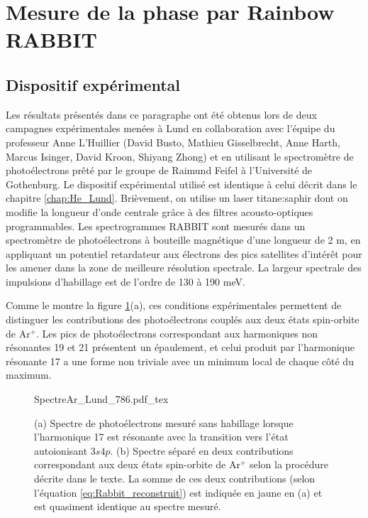 \section{Mesure de la phase par Rainbow RABBIT}
\label{sec:ArRainbow}
\subsection{Dispositif expérimental}
Les résultats présentés dans ce paragraphe ont été obtenus lors de deux campagnes expérimentales menées à Lund en collaboration avec l'équipe du professeur Anne L'Huillier (David Busto, Mathieu Gisselbrecht, Anne Harth, Marcus Isinger, David Kroon, Shiyang Zhong) et en utilisant le spectromètre de photoélectrons prêté par le groupe de Raimund Feifel à l'Université de Gothenburg. Le dispositif expérimental utilisé est identique à celui décrit dans le chapitre \ref{chap:He_Lund}. Brièvement, on utilise un laser titane:saphir dont on modifie la longueur d'onde centrale grâce à des filtres acousto-optiques programmables. Les spectrogrammes RABBIT sont mesurés dans un spectromètre de photoélectrons à bouteille magnétique d'une longueur de 2 m, en appliquant un potentiel retardateur aux électrons des pics satellites d'intérêt pour les amener dans la zone de meilleure résolution spectrale. La largeur spectrale des impulsions d'habillage est de l'ordre de 130 à 190 meV. 

Comme le montre la figure \ref{fig:SpectreAr_Lund_786}(a), ces conditions expérimentales permettent de distinguer les contributions des photoélectrons couplés aux deux états spin-orbite de Ar$^+$. Les pics de photoélectrons correspondant aux harmoniques non résonantes 19 et 21 présentent un épaulement, et celui produit par l'harmonique résonante 17 a une forme non triviale avec un minimum local de chaque côté du maximum. 

\begin{figure}
\centering
\def\svgwidth{1\textwidth}
{SpectreAr_Lund_786.pdf_tex}
\caption{(a) Spectre de photoélectrons mesuré sans habillage lorsque l'harmonique 17 est résonante avec la transition vers l'état autoionisant $3s4p$. (b) Spectre séparé en deux contributions correspondant aux deux états spin-orbite de Ar$^+$ selon la procédure décrite dans le texte. La somme de ces deux contributions (selon l'équation \ref{eq:Rabbit_reconstruit}) est indiquée en jaune en (a) et est quasiment identique au spectre mesuré.}
\label{fig:SpectreAr_Lund_786}
\end{figure}

